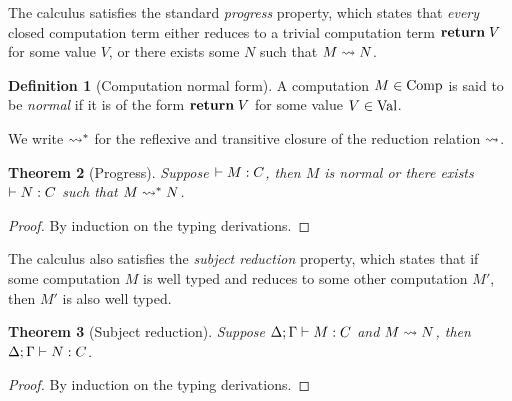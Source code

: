 \documentclass[12pt,phd,lfcs,twoside,openright,logo,leftchapter,normalheadings]{infthesis}
\theoremstyle{plain}
\newtheorem{theorem}{Theorem}[chapter]
\newtheorem{corollary}[theorem]{Corollary}
\newtheorem{claim}[theorem]{Claim}
\theoremstyle{definition}
\newtheorem{definition}[theorem]{Definition}
\begin{document}
%
The calculus satisfies the standard \emph{progress} property, which
states that \emph{every} closed computation term either reduces to a
trivial computation term $\mathbf{return}\;V$ for some value $V$, or there
exists some $N$ such that $M \leadsto N$.
%
\begin{definition}[Computation normal form]\label{def:base-language-comp-normal}
  A computation $M \in \textrm{Comp}$ is said to be \emph{normal} if it is
  of the form $\mathbf{return}\; V$ for some value $V \in \textrm{Val}$.
\end{definition}
%
We write $\leadsto^\ast$ for the reflexive and transitive closure of
the reduction relation $\leadsto$.
%
\begin{theorem}[Progress]\label{thm:base-language-progress}
  Suppose $\vdash M : C$, then $M$ is normal or there exists
  $\vdash N : C$ such that $M \leadsto^\ast N$.
\end{theorem}
%
\begin{proof}
  By induction on the typing derivations.
\end{proof}
%
%
The calculus also satisfies the \emph{subject reduction} property,
which states that if some computation $M$ is well typed and reduces to
some other computation $M'$, then $M'$ is also well typed.
%
\begin{theorem}[Subject reduction]\label{thm:base-language-preservation}
  Suppose $\Delta;\Gamma \vdash M : C$ and $M \leadsto N$, then
  $\Delta;\Gamma \vdash N : C$.
\end{theorem}
%
\begin{proof}
  By induction on the typing derivations.
\end{proof}

\end{document}
